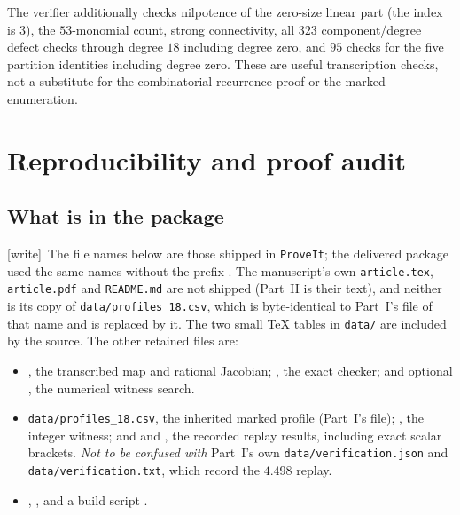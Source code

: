 \documentclass[11pt,a4paper]{article}
\theoremstyle{definition}
\theoremstyle{remark}
\newcommand{\repo}{\texttt{ProveIt}}
\newcommand{\wtag}{\textsf{\small[write]}}
\begin{document}
The verifier additionally checks nilpotence of the zero-size linear part
(the index is $3$), the $53$-monomial count, strong connectivity, all
$323$ component/degree defect checks through degree $18$ including degree
zero, and $95$ checks for the five partition identities including degree
zero. These are useful transcription checks, not a substitute for the
combinatorial recurrence proof or the marked enumeration.

\section{Reproducibility and proof audit}
\label{kfp:sat:sec:audit}

\subsection{What is in the package}
\wtag\ The file names below are those shipped in \repo; the delivered
package used the same names without the prefix
. The manuscript's own \texttt{article.tex},
\texttt{article.pdf} and \texttt{README.md} are not shipped (Part~II is
their text), and neither is its copy of \texttt{data/profiles\_18.csv}, which
is byte-identical to Part~I's file of that name and is replaced by it.
The two small TeX tables in \texttt{data/} are
included by the source. The other retained files are:
\begin{itemize}[leftmargin=1.6em,itemsep=2pt]
\item {}, the transcribed map
and rational Jacobian; , the
exact checker; and optional ,
the numerical witness search.
\item \texttt{data/profiles\_18.csv}, the inherited marked profile (Part~I's
file); , the
integer witness; and 
and , the recorded replay
results, including exact scalar brackets. \emph{Not to be confused with}
Part~I's own \texttt{data/verification.json} and
\texttt{data/verification.txt}, which record the $4.498$ replay.
\item {},
, and a build script
.
\end{itemize}
\end{document}
